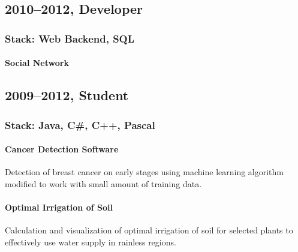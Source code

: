 \subsection*{2010–2012, Developer}
\subsubsection*{Stack: Web Backend, SQL}
\paragraph{Social Network}

\subsection*{2009–2012, Student}
\subsubsection*{Stack: Java, C\#, C++, Pascal}

\paragraph{Cancer Detection Software}
Detection of breast cancer on early stages using machine learning algorithm modified to work with small amount of training data.

\paragraph{Optimal Irrigation of Soil}
Calculation and visualization of optimal irrigation of soil for selected plants to effectively use water supply in rainless regions.



